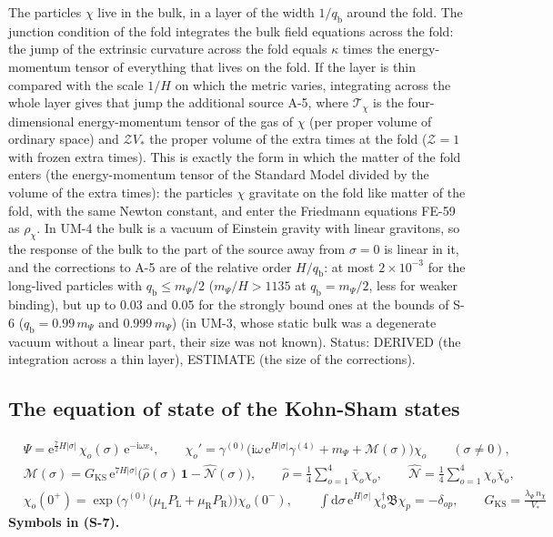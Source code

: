 \documentclass[
  10pt,
]{article}
\begin{document}
The particles \(\chi\) live in the bulk, in a layer of the width
\(1/q_{\mathrm{b}}\) around the fold. The junction condition of the fold
integrates the bulk field equations across the fold: the jump of the
extrinsic curvature across the fold equals \(\kappa\) times the
energy-momentum tensor of everything that lives on the fold. If the
layer is thin compared with the scale \(1/H\) on which the metric
varies, integrating across the whole layer gives that jump the
additional source A-5, where \(\mathcal{T}_\chi\) is the
four-dimensional energy-momentum tensor of the gas of \(\chi\) (per
proper volume of ordinary space) and \(\mathcal{Z}V_*\) the proper
volume of the extra times at the fold (\(\mathcal{Z} = 1\) with frozen
extra times). This is exactly the form in which the matter of the fold
enters (the energy-momentum tensor of the Standard Model divided by the
volume of the extra times): the particles \(\chi\) gravitate on the fold
like matter of the fold, with the same Newton constant, and enter the
Friedmann equations FE-59 as \(\rho_\chi\). In UM-4 the bulk is a vacuum
of Einstein gravity with linear gravitons, so the response of the bulk
to the part of the source away from \(\sigma = 0\) is linear in it, and
the corrections to A-5 are of the relative order \(H/q_{\mathrm{b}}\):
at most \(2\times10^{-3}\) for the long-lived particles with
\(q_{\mathrm{b}} \le m_\Psi/2\) (\(m_\Psi/H > 1135\) at
\(q_{\mathrm{b}} = m_\Psi/2\), less for weaker binding), but up to 0.03
and 0.05 for the strongly bound ones at the bounds of S-6
(\(q_{\mathrm{b}} = 0.99\,m_\Psi\) and \(0.999\,m_\Psi\)) (in UM-3,
whose static bulk was a degenerate vacuum without a linear part, their
size was not known). Status: DERIVED (the integration across a thin
layer), ESTIMATE (the size of the corrections).

\hypertarget{the-equation-of-state-of-the-kohn-sham-states}{%
\subsection{The equation of state of the Kohn-Sham
states}\label{the-equation-of-state-of-the-kohn-sham-states}}

\[
\begin{aligned}
&\Psi = \mathrm{e}^{\frac72H\lvert\sigma\rvert}\,\chi_o(\sigma)\,\mathrm{e}^{-\mathrm{i}\omega x_4},\qquad
 \chi_o' = \gamma^{(0)}\Big(\mathrm{i}\omega\,\mathrm{e}^{H\lvert\sigma\rvert}\gamma^{(4)} + m_\Psi + \mathcal{M}(\sigma)\Big)\chi_o\qquad(\sigma \ne 0),\\
&\mathcal{M}(\sigma) = G_{\mathrm{KS}}\,\mathrm{e}^{7H\lvert\sigma\rvert}\Big(\hat\rho(\sigma)\,\mathbf{1} - \hat{\mathcal{N}}(\sigma)\Big),\qquad
 \hat\rho = \frac14\sum_{o=1}^{4}\bar\chi_o\chi_o,\qquad \hat{\mathcal{N}} = \frac14\sum_{o=1}^{4}\chi_o\bar\chi_o,\\
&\chi_o(0^+) = \exp\Big(\gamma^{(0)}\big(\mu_{\mathrm{L}}P_{\mathrm{L}} + \mu_{\mathrm{R}}P_{\mathrm{R}}\big)\Big)\chi_o(0^-),\qquad
 \int\mathrm{d}\sigma\,\mathrm{e}^{H\lvert\sigma\rvert}\,\chi_o^\dagger\mathfrak{B}\chi_p = -\delta_{op},\qquad G_{\mathrm{KS}} = \frac{\lambda_\Psi\,n_\chi}{V_*}
\end{aligned} \tag{S-7}
\] \textbf{Symbols in (S-7).}
\end{document}
